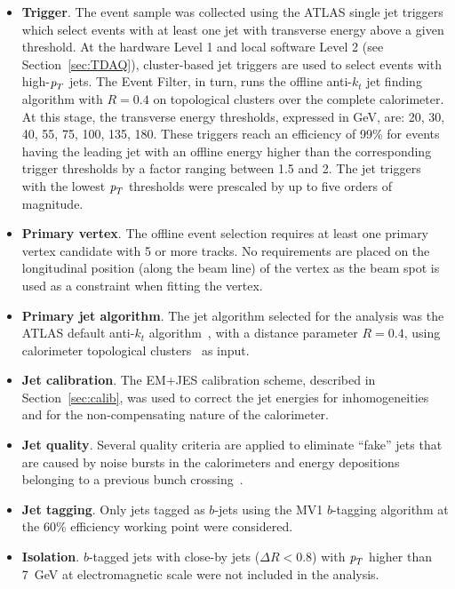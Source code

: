 \begin{itemize}
\item
\textbf{Trigger}. The event sample was collected  using the ATLAS single jet triggers which select events with at least one jet with transverse energy above a given threshold.  At the hardware Level 1 and local software Level 2 (see Section~\ref{sec:TDAQ}), cluster-based jet triggers are used to select events with high-${\emph{p}_{T}}$ jets. The Event Filter, in turn, runs  the offline anti-$k_t$ jet finding algorithm with $R = 0.4$ on topological clusters over the complete calorimeter.  At this stage, the transverse energy thresholds, expressed in GeV, are: 20, 30, 40, 55, 75, 100, 135, 180. These triggers reach an efficiency of 99\% for events having the leading jet with an offline energy higher than the corresponding trigger thresholds by a factor ranging between 1.5 and 2. The jet triggers with the lowest ${\emph{p}_{T}}$ thresholds were prescaled by up to five orders of magnitude. %
\item
\textbf{Primary vertex}.  The offline event selection requires at least one primary vertex candidate with 5 or more tracks.  No requirements are placed on the longitudinal position (along the beam line) of the vertex as the beam spot is used as a constraint when fitting the vertex. 
\item
\textbf{Primary jet algorithm}. The jet algorithm selected for the analysis was the ATLAS default anti-$k_t$ algorithm~\cite{antiktalg}, with a distance parameter $R = 0.4$, using calorimeter topological clusters~\cite{topoClusters} as input.
\item
\textbf{Jet calibration}.  The EM+JES calibration scheme, described in Section~\ref{sec:calib}, was used to correct the jet energies for inhomogeneities and for the non-compensating nature of the calorimeter.
\item
\textbf{Jet quality}.  Several quality criteria are applied to eliminate ``fake'' jets that are caused by noise bursts in the calorimeters and energy depositions belonging to a previous bunch crossing~\cite{ATLAS-CONF-2012-020}.
\item
\textbf{Jet tagging}.  Only jets tagged as $b$-jets using the MV1 $b$-tagging algorithm at the 60\% efficiency working point were considered.
\item
\textbf{Isolation}.  $b$-tagged jets with close-by jets ($\Delta R < 0.8$) with ${\emph{p}_{T}}$ higher than 7~GeV at electromagnetic scale were not included in the analysis.
\end{itemize}

